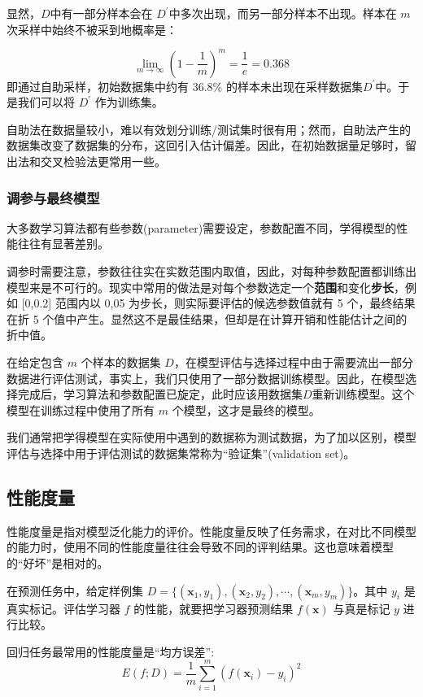 显然，$D$中有一部分样本会在 $D^{'}$中多次出现，而另一部分样本不出现。样本在 $m$ 次采样中始终不被采到地概率是：

\begin{equation}
    \lim_{m\rightarrow\infty}(1-\frac{1}{m})^m = \frac{1}{e} = 0.368
\end{equation}
即通过自助采样，初始数据集中约有 36.8\% 的样本未出现在采样数据集$D^{'}$中。于是我们可以将 $D^{'}$ 作为训练集。

自助法在数据量较小，难以有效划分训练/测试集时很有用；然而，自助法产生的数据集改变了数据集的分布，这回引入估计偏差。因此，在初始数据量足够时，留出法和交叉检验法更常用一些。

\subsubsection{调参与最终模型}

大多数学习算法都有些参数(parameter)需要设定，参数配置不同，学得模型的性能往往有显著差别。

调参时需要注意，参数往往实在实数范围内取值，因此，对每种参数配置都训练出模型来是不可行的。现实中常用的做法是对每个参数选定一个\textbf{范围}和变化\textbf{步长}，例如 [0,0.2] 范围内以 0,05 为步长，则实际要评估的候选参数值就有 5 个，最终结果在折 5 个值中产生。显然这不是最佳结果，但却是在计算开销和性能估计之间的折中值。

在给定包含 $m$ 个样本的数据集 $D$，在模型评估与选择过程中由于需要流出一部分数据进行评估测试，事实上，我们只使用了一部分数据训练模型。因此，在模型选择完成后，学习算法和参数配置已旋定，此时应该用数据集$D$重新训练模型。这个模型在训练过程中使用了所有 $m$ 个模型，这才是最终的模型。

我们通常把学得模型在实际使用中遇到的数据称为测试数据，为了加以区别，模型评估与选择中用于评估测试的数据集常称为``验证集''(validation set)。

\subsection{性能度量}

性能度量是指对模型泛化能力的评价。性能度量反映了任务需求，在对比不同模型的能力时，使用不同的性能度量往往会导致不同的评判结果。这也意味着模型的``好坏''是相对的。

在预测任务中，给定样例集 $D=\{(\bm{x}_1,y_1),(\bm{x}_2,y_2),\cdots,(\bm{x}_m,y_m)\}$。其中 $y_i$ 是真实标记。评估学习器 $f$ 的性能，就要把学习器预测结果 $f(\bm{x})$ 与真是标记 $y$ 进行比较。

回归任务最常用的性能度量是``均方误差'':
\begin{equation}
    E(f;D) = \frac{1}{m}\sum_{i=1}^{m}(f(\bm{x}_i)-y_i)^2
\end{equation}


